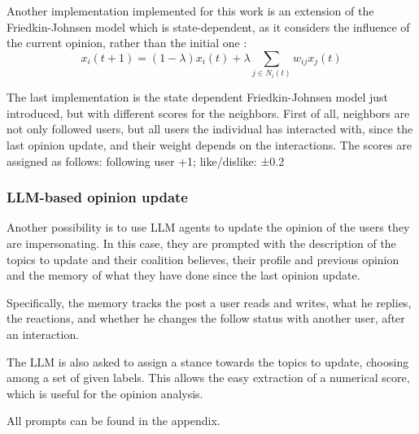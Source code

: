 Another implementation implemented for this work is an extension of the Friedkin-Johnsen model which is state-dependent, as it considers the influence of the current opinion, rather than the initial one \cite{Ye2018Opinion}:
\[
x_i(t + 1) = (1 - \lambda) x_i(t) + \lambda  \sum_{j \in N_i(t)} w_{ij} x_j (t)
\]

The last implementation is the state dependent Friedkin-Johnsen model just introduced, but with different scores for the neighbors. 
First of all, neighbors are not only followed users, but all users the individual has interacted with, since the last opinion update, and their weight depends on the interactions. 
The scores are assigned as follows: following user +1; like/dislike: ±0.2



\subsubsection{LLM-based opinion update}
Another possibility is to use LLM agents to update the opinion of the users they are impersonating.
In this case, they are prompted with the description of the topics to update and their coalition believes, their profile and previous opinion and the memory of what they have done since the last opinion update.

Specifically, the memory tracks the post a user reads and writes, what he replies, the reactions, and whether he changes the follow status with another user, after an interaction. 

The LLM is also asked to assign a stance towards the topics to update, choosing among a set of given labels. This allows the easy extraction of a numerical score, which is useful for the opinion analysis.

All prompts can be found in the appendix.